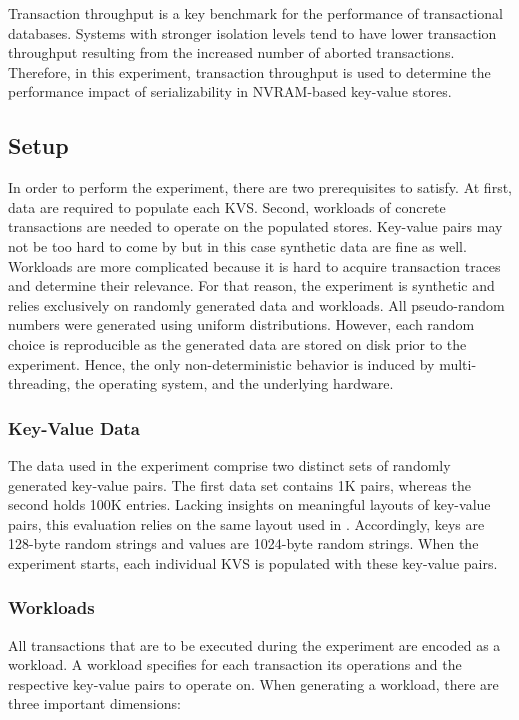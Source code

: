 Transaction throughput is a key benchmark for the performance of transactional
databases. Systems with stronger isolation levels tend to have lower transaction
throughput resulting from the increased number of aborted transactions.
Therefore, in this experiment, transaction throughput is used to determine the
performance impact of serializability in NVRAM-based key-value stores.

\subsection{Setup}

In order to perform the experiment, there are two prerequisites to satisfy. At
first, data are required to populate each KVS. Second, workloads of concrete
transactions are needed to operate on the populated stores. Key-value pairs may
not be too hard to come by but in this case synthetic data are fine as well.
Workloads are more complicated because it is hard to acquire transaction traces
and determine their relevance. For that reason, the experiment is synthetic and
relies exclusively on randomly generated data and workloads. All pseudo-random
numbers were generated using uniform distributions. However, each random choice
is reproducible as the generated data are stored on disk prior to the
experiment. Hence, the only non-deterministic behavior is induced by
multi-threading, the operating system, and the underlying hardware.

\subsubsection{Key-Value Data}

The data used in the experiment comprise two distinct sets of randomly generated
key-value pairs. The first data set contains 1K pairs, whereas the second holds
100K entries. Lacking insights on meaningful layouts of key-value pairs, this
evaluation relies on the same layout used in \cite{bailey2013exploring}.
Accordingly, keys are 128-byte random strings and values are 1024-byte random
strings. When the experiment starts, each individual KVS is populated with these
key-value pairs.

\subsubsection{Workloads}

All transactions that are to be executed during the experiment are encoded as a
workload. A workload specifies for each transaction its operations and the
respective key-value pairs to operate on. When generating a workload, there are
three important dimensions:

